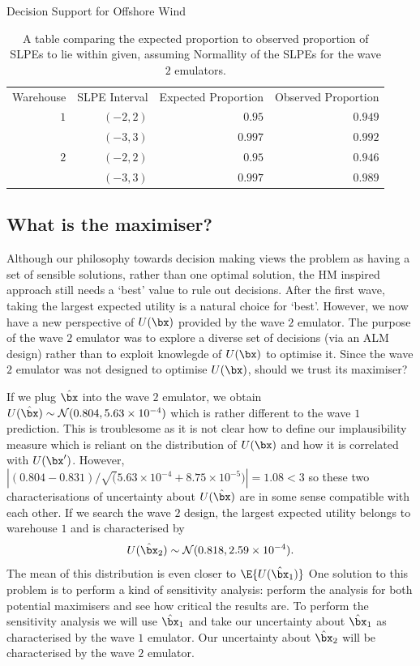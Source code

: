 \begin{chapter}{Decision Support for Offshore Wind \label{Ch:ds-for-ow}}
\begin{table}
  \centering
  \begin{tabular}{rrrr}
    \toprule
    Warehouse & SLPE Interval & Expected Proportion & Observed Proportion \\\cmidrule{1-4}
    $1$ & $(-2,2)$&$0.95$ & $0.949$\\
    &$(-3,3)$& $0.997$ &  $0.992$ \\\cmidrule{1-4}
    $2$ & $(-2,2)$&$0.95$ & $0.946$\\
    &$(-3,3)$& $0.997$ &  $0.989$ \\\bottomrule
  \end{tabular}
  \caption{A table comparing the expected proportion to observed proportion of SLPEs to lie within given, assuming Normallity of the SLPEs for the wave $2$ emulators.}
  \label{Tab:cred2}
\end{table}
\subsection{What is the maximiser?}
Although our philosophy towards decision making views the problem as having a set of sensible solutions, rather than one optimal solution, the HM inspired approach still needs a `best' value to rule out decisions. After the first wave, taking the largest expected utility is a natural choice for `best'. However, we now have a new perspective of $U(\bx)$ provided by the wave $2$ emulator. The purpose of the wave $2$ emulator was to explore a diverse set of decisions (via an ALM design) rather than to exploit knowlegde of $U(\bx)$ to optimise it. Since the wave $2$ emulator was not designed to optimise $U(\bx)$, should we trust its maximiser?

If we plug $\hat{\bx}$ into the wave $2$ emulator, we obtain $U(\hat{\bx})  \sim \mathcal{N}(0.804, 5.63\times10^{-4})$ which is rather different to the wave $1$ prediction. This is troublesome as it is not clear how to define our implausibility measure which is reliant on the distribution of $U(\bx)$ and how it is correlated with $U(\bx')$. However, $|(0.804 - 0.831)/\sqrt(5.63\times10^{-4} + 8.75\times 10^{-5} )| = 1.08 < 3$ so these two characterisations of uncertainty about $U(\hat{\bx})$ are in some sense compatible with each other. If we search the wave $2$ design, the largest expected utility belongs to warehouse $1$ and is characterised by
\begin{equation}
  U(\hat{\bx}_2)  \sim \mathcal{N}(0.818, 2.59 \times 10^{-4}).
\end{equation}
The mean of this distribution is even closer to $\E\{U(\hat{\bx}_1)\}$
One solution to this problem is to perform a kind of sensitivity analysis: perform the analysis for both potential maximisers and see how critical the results are. To perform the sensitivity analysis we will use $\hat{\bx}_1$ and take our uncertainty about $\hat{\bx}_1$ as characterised by the wave $1$ emulator. Our uncertainty about $\hat{\bx}_2$ will be characterised by the wave $2$ emulator.


\end{chapter}
